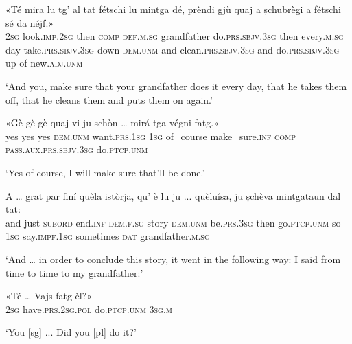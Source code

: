 \begin{linenumbers}
\gll  «Té mira lu tg’ al tat fétschi lu mintga dé, prèndi gjù quaj a ṣchubrègi a fétschi sé da néjf.»  \\
 \textsc{2sg} look.\textsc{imp.2sg} then \textsc{comp} \textsc{def.m.sg} grandfather do.\textsc{prs.sbjv.3sg} then every.\textsc{m.sg} day take.\textsc{prs.sbjv.3sg} down \textsc{dem.unm} and clean.\textsc{prs.sbjv.3sg} and do.\textsc{prs.sbjv.3sg} up of new.\textsc{adj.unm} \\
\end{linenumbers}
\medskip
\glt `And you, make sure that your grandfather does it every day, that he takes them off, that he cleans them and puts them on again.'
\medskip

\begin{linenumbers}
\gll  «Gè gè gè quaj vi ju schòn … mirá tga végni fatg.»  \\
yes yes yes  \textsc{dem.unm} want.\textsc{prs.1sg} \textsc{1sg} of\_course {}  make\_sure.\textsc{inf} \textsc{comp} \textsc{pass.aux.prs.sbjv.3sg} do.\textsc{ptcp.unm}   \\
\end{linenumbers}
\medskip
\glt `Yes of course, I will make sure that'll be done.'
\medskip

\largerpage
\begin{linenumbers}
\gll  A … grat par finí quèla istòrja, qu’ è lu ju ... quèluísa, ju ṣchèva mintgataun dal tat:  \\
and {} just  \textsc{subord} end.\textsc{inf} \textsc{dem.f.sg} story \textsc{dem.unm} be.\textsc{prs.3sg} then go.\textsc{ptcp.unm} {} so \textsc{1sg} say.\textsc{impf.1sg}  sometimes \textsc{dat} grandfather.\textsc{m.sg} \\
\end{linenumbers}
\medskip
\glt `And … in order to conclude this story, it went in the following way: I said from time to time to my grandfather:'
\medskip

\begin{linenumbers}
\gll «Té\footnotemark{} … Vajs fatg èl?»   \\
 \textsc{2sg} {} have.\textsc{prs.2sg.pol} do.\textsc{ptcp.unm} \textsc{3sg.m}\\
\end{linenumbers}
\medskip
\glt `You [sg] ... Did you [pl] do it?'


